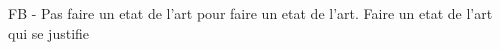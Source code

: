 FB - Pas faire un etat de l'art pour faire un etat de l'art.
Faire un etat de l'art qui se justifie



